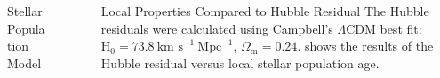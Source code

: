 \documentclass[final]{beamer}
\newlength{\sepwid}
\newlength{\onecolwid}
\begin{document}
\begin{frame}[t]
\begin{columns}[t]
\begin{column}{\onecolwid}
\begin{block}{Stellar Population Model}
\end{block}
\end{column}

\begin{column}{\sepwid}\end{column}\label{centerspace}

\begin{column}{\onecolwid}


\begin{block}{Local Properties Compared to Hubble Residual}
The Hubble residuals were calculated using Campbell's $\Lambda$CDM best fit: $\text{H}_{0}=73.8~\text{km s}^{-1}~\text{Mpc}^{-1}$, $\Omega_{\text{m}}=0.24$.  shows the results of the Hubble residual versus local stellar population age.



\end{block}
\end{column}
\end{columns}
\end{frame}
\end{document}

